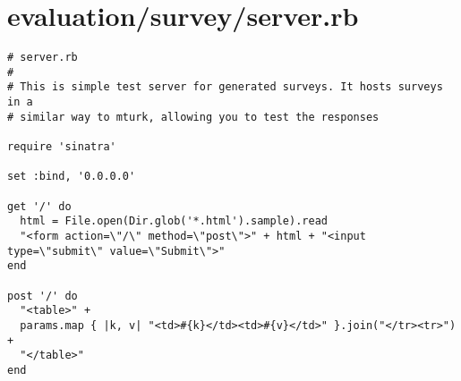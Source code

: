 \documentclass{article}
\begin{document}
\section*{evaluation/survey/server.rb}
\begin{verbatim}
# server.rb
#
# This is simple test server for generated surveys. It hosts surveys in a
# similar way to mturk, allowing you to test the responses

require 'sinatra'

set :bind, '0.0.0.0'

get '/' do
  html = File.open(Dir.glob('*.html').sample).read
  "<form action=\"/\" method=\"post\">" + html + "<input type=\"submit\" value=\"Submit\">"
end

post '/' do
  "<table>" +
  params.map { |k, v| "<td>#{k}</td><td>#{v}</td>" }.join("</tr><tr>") +
  "</table>"
end


\end{verbatim}
\pagebreak
\end{document}
